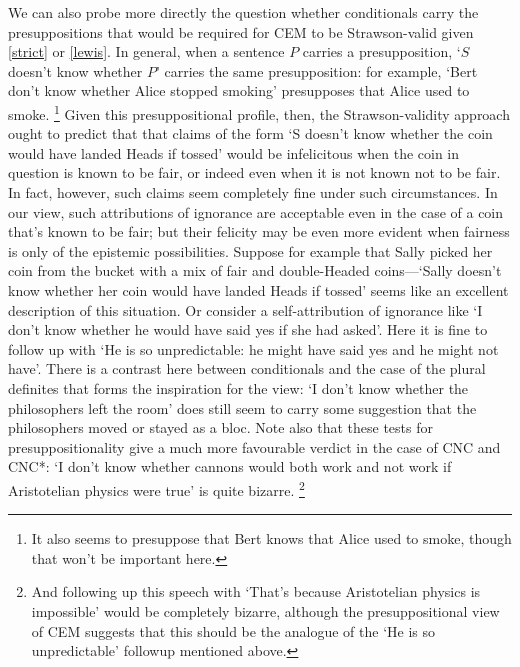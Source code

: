 \documentclass[If.tex]{subfiles}
\begin{document}
We can also probe more directly the question whether conditionals carry the presuppositions that would be required for CEM to be Strawson-valid given \ref{strict} or \ref{lewis}.  In general, when a sentence $P$ carries a presupposition, ‘$S$ doesn't know whether $P$’ carries the same presupposition: for example, ‘Bert don't know whether Alice stopped smoking’ presupposes that Alice used to smoke.%
\footnote{It also seems to presuppose that Bert knows that Alice used to smoke, though that won't be important here.}
Given this presuppositional profile, then, the Strawson-validity approach ought to predict that that claims of the form ‘S doesn't know whether the coin would have landed Heads if tossed’ would be infelicitous when the coin in question is known to be fair, or indeed even when it is not known not to be fair.  In fact, however, such claims seem completely fine under such circumstances.  In our view, such attributions of ignorance are acceptable even in the case of a coin that's known to be fair; but their felicity may be even more evident when fairness is only of the epistemic possibilities.   Suppose for example that Sally picked her coin from the bucket with a mix of fair and double-Headed coins---‘Sally doesn't know whether her coin would have landed Heads if tossed’ seems like an excellent description of this situation.  Or consider a self-attribution of ignorance like ‘I don't know whether he would have said yes if she had asked’.  Here it is fine to follow up with ‘He is so unpredictable: he might have said yes and he might not have’.  There is a contrast here between conditionals and the case of the plural definites that forms the inspiration for the view: ‘I don't know whether the philosophers left the room’ does still seem to carry some suggestion that the philosophers moved or stayed as a bloc.  Note also that these tests for presuppositionality give a much more favourable verdict in the case of CNC and CNC*: ‘I don't know whether cannons would both work and not work if Aristotelian physics were true’ is quite bizarre.%
\footnote{And following up this speech with ‘That's because Aristotelian physics is impossible’ would be completely bizarre, although the presuppositional view of CEM suggests that this should be the analogue of the ‘He is so unpredictable’ followup mentioned above.}


\begin{comment}
	\begin{itemize}
		\item
		Of course one can consider hybrid views: for example, Kratzer (???Conditionals) develops a view that conforms to \ref{strict} for indicatives and \ref{lewis} for counterfactuals.
		\item
		Like \ref{closest}, \ref{lewis} and \ref{strict} can be fleshed out in different ways,
		according to one's favoured gloss on accessibility, worlds, and (in
		the case of \ref{lewis}) closeness.
		\item
		Add: pointing out some nice logical features of CEM, e.g.~the way that
		it makes various things entail CSO and one another.
	\end{itemize}
\end{comment}
\end{document}
